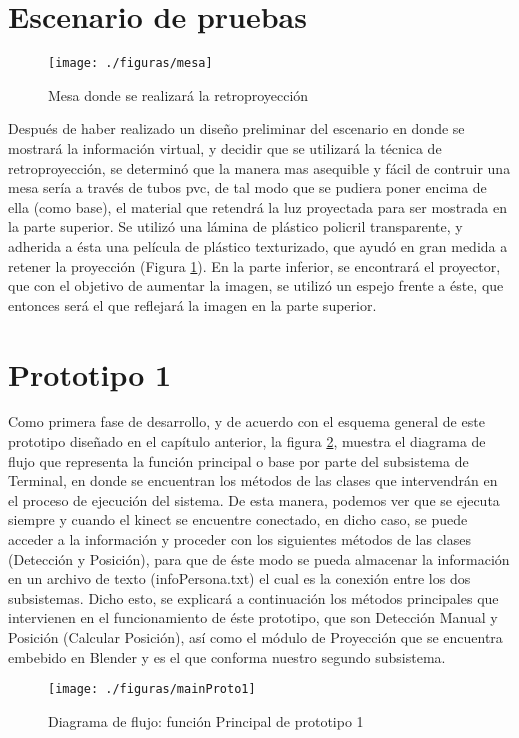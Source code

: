 \documentclass[a4paper,openright,12pt]{report}
\begin{document}
\section{Escenario de pruebas}
\begin{figure}[ht]
	\centering
	\texttt{[image: ./figuras/mesa]}
	\caption{Mesa donde se realizará la retroproyección} \label{fig:mesa}
\end{figure}
Después de haber realizado un diseño preliminar del escenario en donde se mostrará la información virtual, y decidir que se utilizará la técnica de retroproyección, se determinó que la manera mas asequible y fácil de contruir una mesa sería a través de tubos pvc, de tal modo que se pudiera poner encima de ella (como base), el material que retendrá la luz proyectada para ser mostrada en la parte superior. Se utilizó una lámina de plástico policril transparente, y adherida a ésta una película de plástico texturizado, que ayudó en gran medida a retener la proyección (Figura \ref{fig:mesa}). En la parte inferior, se encontrará el proyector, que con el objetivo de aumentar la imagen, se utilizó un espejo frente a éste, que entonces será el que reflejará la imagen en la parte superior.


\section{Prototipo 1}
Como primera fase de desarrollo, y de acuerdo con el esquema general de este prototipo diseñado en el capítulo anterior, la figura \ref{fig:mainProto1}, muestra el diagrama de flujo que representa la función principal o base por parte del subsistema de Terminal, en donde se encuentran los métodos de las clases que intervendrán en el proceso de ejecución del sistema. De esta manera, podemos ver que se ejecuta siempre y cuando el kinect se encuentre conectado, en dicho caso, se puede acceder a la información y proceder con los siguientes métodos de las clases (Detección y Posición), para que de éste modo se pueda almacenar la información en un archivo de texto (infoPersona.txt) el cual es la conexión entre los dos subsistemas. Dicho esto, se explicará a continuación los métodos principales que intervienen en el funcionamiento de éste prototipo, que son Detección Manual y Posición (Calcular Posición), así como el módulo de Proyección que se encuentra embebido en Blender y es el que conforma nuestro segundo subsistema.
\begin{figure}[ht]
	\centering
	\texttt{[image: ./figuras/mainProto1]}
	\caption{Diagrama de flujo: función Principal de prototipo 1} \label{fig:mainProto1}
\end{figure}
\end{document}
